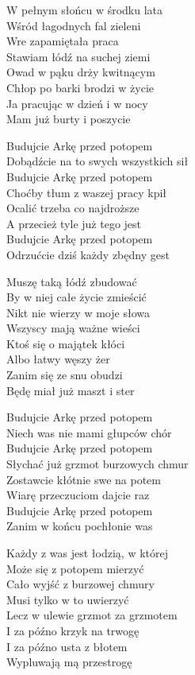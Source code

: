 \begin{text}
    W pełnym słońcu w środku lata\\
    Wśród łagodnych fal zieleni\\
    Wre zapamiętała praca\\
    Stawiam łódź na suchej ziemi\\
    Owad w pąku drży kwitnącym\\
    Chłop po barki brodzi w życie\\
    Ja pracując w dzień i w nocy\\
    Mam już burty i poszycie

    Budujcie Arkę przed potopem\\
    Dobądźcie na to swych wszystkich sił\\
    Budujcie Arkę przed potopem\\
    Choćby tłum z waszej pracy kpił\\
    Ocalić trzeba co najdroższe\\
    A przecież tyle już tego jest\\
    Budujcie Arkę przed potopem\\
    Odrzućcie dziś każdy zbędny gest

    Muszę taką łódź zbudować\\
    By w niej całe życie zmieścić\\
    Nikt nie wierzy w moje słowa\\
    Wszyscy mają ważne wieści\\
    Ktoś się o majątek kłóci\\
    Albo łatwy węszy żer\\
    Zanim się ze snu obudzi\\
    Będę miał już maszt i ster

    Budujcie Arkę przed potopem\\
    Niech was nie mami głupców chór\\
    Budujcie Arkę przed potopem\\
    Słychać już grzmot burzowych chmur\\
    Zostawcie kłótnie swe na potem\\
    Wiarę przeczuciom dajcie raz\\
    Budujcie Arkę przed potopem\\
    Zanim w końcu pochłonie was

    Każdy z was jest łodzią, w której\\
    Może się z potopem mierzyć\\
    Cało wyjść z burzowej chmury\\
    Musi tylko w to uwierzyć\\
    Lecz w ulewie grzmot za grzmotem\\
    I za późno krzyk na trwogę\\
    I za późno usta z błotem\\
    Wypluwają mą przestrogę


\end{text}
